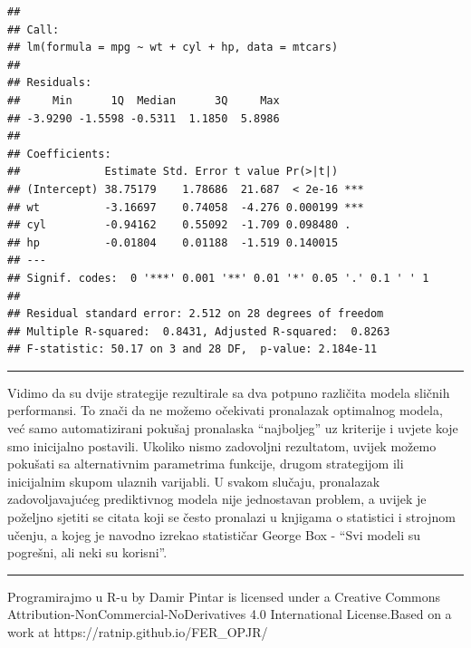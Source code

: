 \documentclass[]{book}
\theoremstyle{definition}
\theoremstyle{definition}
\theoremstyle{definition}
\theoremstyle{remark}
\begin{document}
\begin{verbatim}
## 
## Call:
## lm(formula = mpg ~ wt + cyl + hp, data = mtcars)
## 
## Residuals:
##     Min      1Q  Median      3Q     Max 
## -3.9290 -1.5598 -0.5311  1.1850  5.8986 
## 
## Coefficients:
##             Estimate Std. Error t value Pr(>|t|)    
## (Intercept) 38.75179    1.78686  21.687  < 2e-16 ***
## wt          -3.16697    0.74058  -4.276 0.000199 ***
## cyl         -0.94162    0.55092  -1.709 0.098480 .  
## hp          -0.01804    0.01188  -1.519 0.140015    
## ---
## Signif. codes:  0 '***' 0.001 '**' 0.01 '*' 0.05 '.' 0.1 ' ' 1
## 
## Residual standard error: 2.512 on 28 degrees of freedom
## Multiple R-squared:  0.8431, Adjusted R-squared:  0.8263 
## F-statistic: 50.17 on 3 and 28 DF,  p-value: 2.184e-11
\end{verbatim}

\begin{center}\rule{0.5\linewidth}{\linethickness}\end{center}

Vidimo da su dvije strategije rezultirale sa dva potpuno različita
modela sličnih performansi. To znači da ne možemo očekivati pronalazak
optimalnog modela, već samo automatizirani pokušaj pronalaska
``najboljeg'' uz kriterije i uvjete koje smo inicijalno postavili.
Ukoliko nismo zadovoljni rezultatom, uvijek možemo pokušati sa
alternativnim parametrima funkcije, drugom strategijom ili inicijalnim
skupom ulaznih varijabli. U svakom slučaju, pronalazak zadovoljavajućeg
prediktivnog modela nije jednostavan problem, a uvijek je poželjno
sjetiti se citata koji se često pronalazi u knjigama o statistici i
strojnom učenju, a kojeg je navodno izrekao statističar George Box -
``Svi modeli su pogrešni, ali neki su korisni''.

\begin{center}\rule{0.5\linewidth}{\linethickness}\end{center}

{Programirajmo u R-u} by Damir Pintar is licensed under a Creative
Commons Attribution-NonCommercial-NoDerivatives 4.0 International
License.Based on a work at https://ratnip.github.io/FER\_OPJR/


\end{document}
